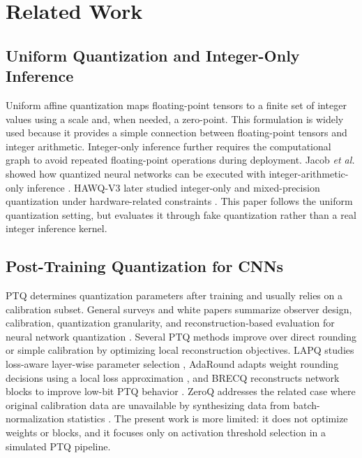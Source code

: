 
\section{Related Work}
\label{sec:related_work}

\subsection{Uniform Quantization and Integer-Only Inference}
Uniform affine quantization maps floating-point tensors to a finite set of integer values using a scale and, when needed, a zero-point. This formulation is widely used because it provides a simple connection between floating-point tensors and integer arithmetic. Integer-only inference further requires the computational graph to avoid repeated floating-point operations during deployment. Jacob \textit{et al.} showed how quantized neural networks can be executed with integer-arithmetic-only inference \cite{jacob2018quantization}. HAWQ-V3 later studied integer-only and mixed-precision quantization under hardware-related constraints \cite{yao2020hawqv3}. This paper follows the uniform quantization setting, but evaluates it through fake quantization rather than a real integer inference kernel.

\subsection{Post-Training Quantization for CNNs}
PTQ determines quantization parameters after training and usually relies on a calibration subset. General surveys and white papers summarize observer design, calibration, quantization granularity, and reconstruction-based evaluation for neural network quantization \cite{gholami2021survey,nagel2021whitepaper,krishnamoorthi2018quantizing}. Several PTQ methods improve over direct rounding or simple calibration by optimizing local reconstruction objectives. LAPQ studies loss-aware layer-wise parameter selection \cite{nahshan2019loss}, AdaRound adapts weight rounding decisions using a local loss approximation \cite{nagel2020adaround}, and BRECQ reconstructs network blocks to improve low-bit PTQ behavior \cite{li2021brecq}. ZeroQ addresses the related case where original calibration data are unavailable by synthesizing data from batch-normalization statistics \cite{cai2020zeroq}. The present work is more limited: it does not optimize weights or blocks, and it focuses only on activation threshold selection in a simulated PTQ pipeline.

